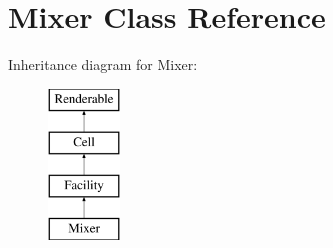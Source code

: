 \hypertarget{class_mixer}{}\section{Mixer Class Reference}
\label{class_mixer}
Inheritance diagram for Mixer\+:\begin{figure}[H]
\begin{center}
\leavevmode
\includegraphics[height=4.000000cm]{class_mixer}
\end{center}
\end{figure}
